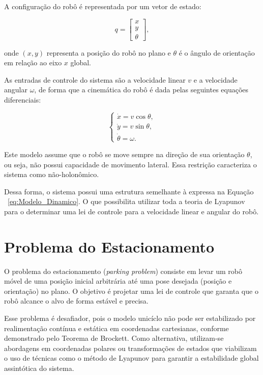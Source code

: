 \documentclass[conference]{IEEEtran}
\begin{document}
A configuração do robô é representada por um vetor de estado:

\begin{equation}
    q = \begin{bmatrix}
        x \\
        y \\
        \theta
    \end{bmatrix},
\end{equation}

onde $(x, y)$ representa a posição do robô no plano e $\theta$ é o ângulo de orientação em relação ao eixo $x$ global.

As entradas de controle do sistema são a velocidade linear $v$ e a velocidade angular $\omega$, de forma que a cinemática do robô é dada pelas seguintes equações diferenciais:

\begin{equation}
    \begin{cases}
        \dot{x} = v \cos \theta, \\
        \dot{y} = v \sin \theta, \\
        \dot{\theta} = \omega.
    \end{cases}
    \label{eq:uniciclo}
\end{equation}

Este modelo assume que o robô se move sempre na direção de sua orientação $\theta$, ou seja, não possui capacidade de movimento lateral. Essa restrição caracteriza o sistema como não-holonômico.

Dessa forma, o sistema possui uma estrutura semelhante à expressa na Equação ~\ref{eq:Modelo_Dinamico}. O que possibilita utilizar toda a teoria de Lyapunov para o determinar uma lei de controle para a velocidade linear e angular do robô.

\section{Problema do Estacionamento}

O problema do estacionamento (\textit{parking problem}) consiste em levar um robô móvel de uma posição inicial arbitrária até uma pose desejada (posição e orientação) no plano. O objetivo é projetar uma lei de controle que garanta que o robô alcance o alvo de forma estável e precisa.

Esse problema é desafiador, pois o modelo unicíclo não pode ser estabilizado por realimentação contínua e estática em coordenadas cartesianas, conforme demonstrado pelo Teorema de Brockett. Como alternativa, utilizam-se abordagens em coordenadas polares ou transformações de estados que viabilizam o uso de técnicas como o método de Lyapunov para garantir a estabilidade global assintótica do sistema.
\end{document}
